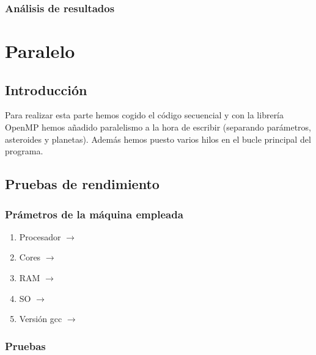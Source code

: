 \documentclass[12pt]{article}
\begin{document}
        \subsubsection{Análisis de resultados}
    \newpage
    \section{Paralelo}
        \subsection{Introducción}
        \noindent Para realizar esta parte hemos cogido el código secuencial y con la librería OpenMP hemos añadido paralelismo a la hora de escribir (separando parámetros, asteroides y planetas). Además hemos puesto varios hilos en el bucle principal del programa.
        \subsection{Pruebas de rendimiento}
        \subsubsection{Prámetros de la máquina empleada}
            \begin{enumerate}
                \item Procesador $\rightarrow$ 
                \item Cores $\rightarrow$ 
                \item RAM $\rightarrow$ 
                \item SO $\rightarrow$ 
                \item Versión gcc $\rightarrow$ 
            \end{enumerate}
        \subsubsection{Pruebas}
        
        
\end{document}
